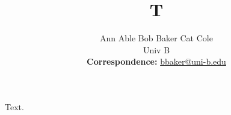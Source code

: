 \documentclass{article}
\title{T}
\author{Ann Able \quad Bob Baker \quad Cat Cole \\
Univ B \\
\small{
  \textbf{Correspondence:} \href{mailto:bbaker@uni-b.edu}{bbaker@uni-b.edu}
}
}
\begin{document}
\maketitle
Text.
\end{document}
